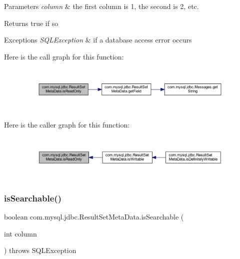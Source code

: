 \begin{DoxyParams}{Parameters}
{\em column} & the first column is 1, the second is 2, etc.\\
\hline
\end{DoxyParams}
\begin{DoxyReturn}{Returns}
true if so
\end{DoxyReturn}

\begin{DoxyExceptions}{Exceptions}
{\em S\+Q\+L\+Exception} & if a database access error occurs \\
\hline
\end{DoxyExceptions}
Here is the call graph for this function\+:
\nopagebreak
\begin{figure}[H]
\begin{center}
\leavevmode
\includegraphics[width=350pt]{classcom_1_1mysql_1_1jdbc_1_1_result_set_meta_data_aa55679657c2de6748866bdb7edae014d_cgraph}
\end{center}
\end{figure}
Here is the caller graph for this function\+:
\nopagebreak
\begin{figure}[H]
\begin{center}
\leavevmode
\includegraphics[width=350pt]{classcom_1_1mysql_1_1jdbc_1_1_result_set_meta_data_aa55679657c2de6748866bdb7edae014d_icgraph}
\end{center}
\end{figure}
\mbox{\label{classcom_1_1mysql_1_1jdbc_1_1_result_set_meta_data_aba01f7ef04aae64a55c7b6d1b27a9b5e}} 
\subsubsection{\texorpdfstring{is\+Searchable()}{isSearchable()}}
{\footnotesize\ttfamily boolean com.\+mysql.\+jdbc.\+Result\+Set\+Meta\+Data.\+is\+Searchable (\begin{DoxyParamCaption}\item[{int}]{column }\end{DoxyParamCaption}) throws S\+Q\+L\+Exception}

